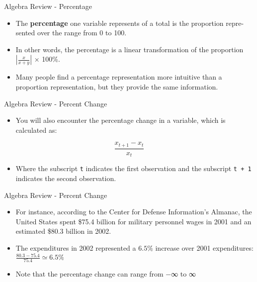 \documentclass[
  ignorenonframetext,
]{beamer}
\providecommand{\tightlist}{%
  \setlength{\itemsep}{0pt}\setlength{\parskip}{0pt}}
\begin{document}
\begin{frame}{Algebra Review - Percentage}
\protect\hypertarget{algebra-review---percentage}{}

\begin{itemize}
\item
  The \textbf{percentage} one variable represents of a total is the
  proportion repre- sented over the range from 0 to 100.
\item
  In other words, the percentage is a linear transformation of the
  proportion \(|\frac{x}{x+y}|\) × 100\%.
\item
  Many people find a percentage representation more intuitive than a
  proportion representation, but they provide the same information.
\end{itemize}

\end{frame}

\begin{frame}[fragile]{Algebra Review - Percent Change}
\protect\hypertarget{algebra-review---percent-change}{}

\begin{itemize}
\tightlist
\item
  You will also encounter the percentage change in a variable, which is
  calculated as:
\end{itemize}

\[\frac{x_{t+1}-x_{t}}{x_{t}}\]

\begin{itemize}
\tightlist
\item
  Where the subscript \texttt{t} indicates the first observation and the
  subscript \texttt{t\ +\ 1} indicates the second observation.
\end{itemize}

\end{frame}

\begin{frame}{Algebra Review - Percent Change}
\protect\hypertarget{algebra-review---percent-change-1}{}

\begin{itemize}
\item
  For instance, according to the Center for Defense Information's
  Almanac, the United States spent \$75.4 billion for military personnel
  wages in 2001 and an estimated \$80.3 billion in 2002.
\item
  The expenditures in 2002 represented a \(6.5\%\) increase over 2001
  expenditures: \(\frac{80.3−75.4}{75.4} ≃ 6.5\%\)
\item
  Note that the percentage change can range from −∞ to ∞
\end{itemize}

\end{frame}
\end{document}
